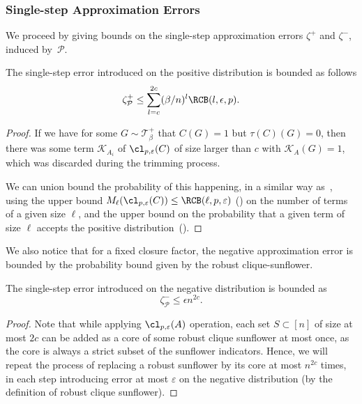 \subsubsection*{Single-step Approximation Errors}

We proceed by giving bounds on the single-step approximation errors $\zeta^+$ and $\zeta^-$, induced by~$\mathcal{P}$.


\begin{lemma}
    \label{lem:positive-error}
    The single-step error introduced on the positive distribution is bounded as follows
    $$\zeta^+_{\mathcal{P}} \leq \sum_{l=c}^{2c} (\beta /n)^l \RCB(l, \epsilon, p).$$
\end{lemma}
 \begin{proof}
    If we have for some $G \sim \mathcal{T}^+_\beta$ that $C(G) = 1$ but $\tau(C)(G) = 0$, then there was some term $\mathcal{K}_{A_i}$ of $\cl_{p,\varepsilon}(C)$ of size larger than $c$ with $\mathcal{K}_A(G) = 1$, which was discarded during the trimming process. 

    We can union bound the probability of this happening, in a similar way as~, using the upper bound $M_\ell(\cl_{p, \varepsilon}(C)) \leq \RCB(\ell, p, \varepsilon)$ () on the number of terms of a given size $\ell$, and the upper bound on the probability that a given term of size $\ell$ accepts the positive distribution~().
\end{proof}

We also notice that for a fixed closure factor, the negative approximation error is bounded by the probability bound given by the robust clique-sunflower.

\begin{lemma}
    \label{lem:negative-error}
    The single-step error introduced on the negative distribution is bounded as 
    $$\zeta^-_{\mathcal{P}} \leq \epsilon n^{2c}.$$
\end{lemma}
\begin{proof}
    Note that while applying $\cl_{p,\varepsilon}(A)$ operation, each set $S \subset [n]$ of size at most $2c$ can be added as a core of some robust clique sunflower at most once, as the core is always a strict subset of the sunflower indicators. Hence, we will repeat the process of replacing a robust sunflower by its core at most $n^{2c}$ times, in each step introducing error at most $\varepsilon$ on the negative distribution (by the definition of robust clique sunflower).
\end{proof}

